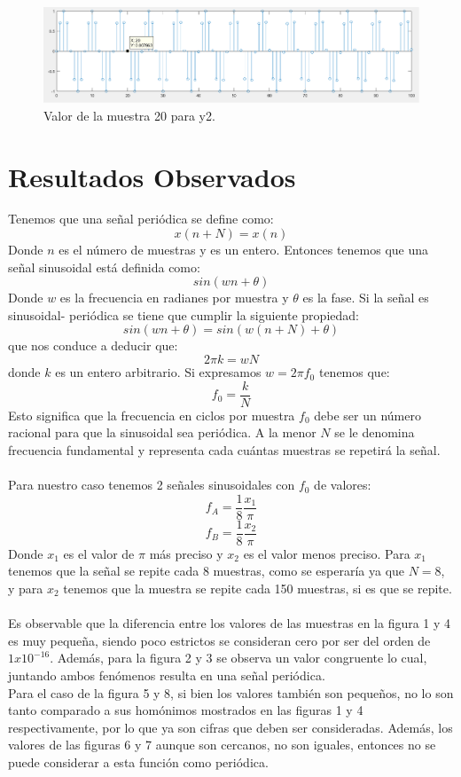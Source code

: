 \documentclass[12pt]{article}
\begin{document}
\begin{figure}[h]
    \centering
        \includegraphics[width=15cm]{IMAGENES/T1_val8.png}
        \caption{Valor de la muestra 20 para y2.}
\end{figure}
\vspace{1mm}

\section{Resultados Observados}
Tenemos que una señal periódica se define como:
$$x(n+N)=x(n)$$
Donde $n$ es el número de muestras y es un entero. Entonces tenemos que una señal sinusoidal está definida como:
$$sin(wn+\theta)$$ 
Donde $w$ es la frecuencia en radianes por muestra y $\theta$ es la fase. Si la señal es sinusoidal-
periódica se tiene que cumplir la siguiente propiedad\cite{proakis1996digital}:
$$sin(wn+\theta)=sin(w(n+N)+\theta)$$
que nos conduce a deducir que:
$$2\pi k=wN$$
donde $k$ es un entero arbitrario. Si expresamos $w=2\pi f_0$ tenemos que:
$$f_0=\frac{k}{N}$$
Esto significa que la frecuencia en ciclos por muestra $f_0$ debe ser un número racional para que la sinusoidal sea periódica.
A la menor $N$ se le denomina frecuencia fundamental y representa cada cuántas muestras se repetirá la señal.\\\\
Para nuestro caso tenemos 2 señales sinusoidales con $f_0$ de valores:
$$f_A=\frac{1}{8}\frac{x_1}{\pi}$$
$$f_B=\frac{1}{8}\frac{x_2}{\pi}$$
Donde $x_1$ es el valor de $\pi$ más preciso y $x_2$ es el valor menos preciso. Para $x_1$ tenemos que la señal se repite cada 8 muestras, como se esperaría ya que $N=8$, y para $x_2$ tenemos que la muestra se repite cada 150 muestras, si es que se repite.
\\\\
Es observable que la diferencia entre los valores de las muestras en la figura 1 y 4 es muy pequeña, siendo poco estrictos se consideran cero por ser del orden de $1x10^{-16}$. Además, para la figura 2 y 3 se observa un valor congruente lo cual, juntando ambos fenómenos resulta en una señal periódica.
\\
Para el caso de la figura 5 y 8, si bien los valores también son pequeños, no lo son tanto comparado a sus homónimos mostrados en las figuras 1 y 4 respectivamente, por lo que ya son cifras que deben ser consideradas. Además, los valores de las figuras 6 y 7 aunque son cercanos, no son iguales, entonces no se puede considerar a esta función como periódica.
\end{document}
